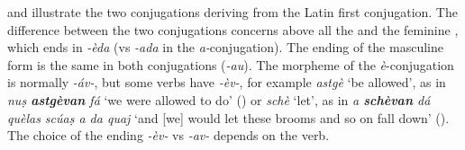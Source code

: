 \label{4.1.1.2.2}
 and  illustrate the two conjugations deriving from the Latin first conjugation. The difference between the two conjugations concerns above all the  and the feminine , which ends in \textit{-èda} (vs \textit{-ada} in the \textit{a-}conjugation). The ending of the masculine form is the same in both conjugations (\textit{-au}). The  morpheme of the \textit{è}-conjugation is normally \textit{-áv-}, but some verbs have \textit{-èv-}, for example \textit{astgè} `be allowed', as in \textit{nuṣ \textbf{astgèvan} fá} `we were allowed to do' () or \textit{schè} `let', as in \textit{a \textbf{schèvan} dá quèlas scúaṣ a da quaj} `and [we] would let these brooms and so on fall down' (). The choice of the ending \textit{-èv-} vs \textit{-av-} depends on the verb.



